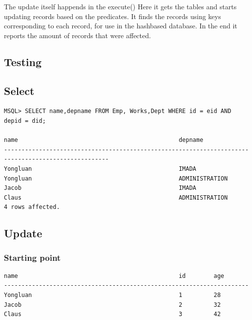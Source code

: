 \documentclass[a4paper,10pt,titlepage]{report}
\begin{document}
The update itself happends in the \textsf{execute()}  Here it gets the tables and starts updating records based on the predicates. It finds the records using keys corresponding to each record, for use in the hashbased database. In the end it reports the amount of records that were affected.



\subsection{Testing}

\subsection{Select}
\begin{lstlisting}
MSQL> SELECT name,depname FROM Emp, Works,Dept WHERE id = eid AND depid = did;

name                                              depname                                           
----------------------------------------------------------------------------------------------------
Yongluan                                          IMADA                                             
Yongluan                                          ADMINISTRATION                                    
Jacob                                             IMADA                                             
Claus                                             ADMINISTRATION                                    
4 rows affected.
\end{lstlisting}

\subsection{Update}
\subsubsection{Starting point}
\begin{lstlisting}
name                                              id        age       
----------------------------------------------------------------------
Yongluan                                          1         28        
Jacob                                             2         32        
Claus                                             3         42       
\end{lstlisting}
\end{document}
